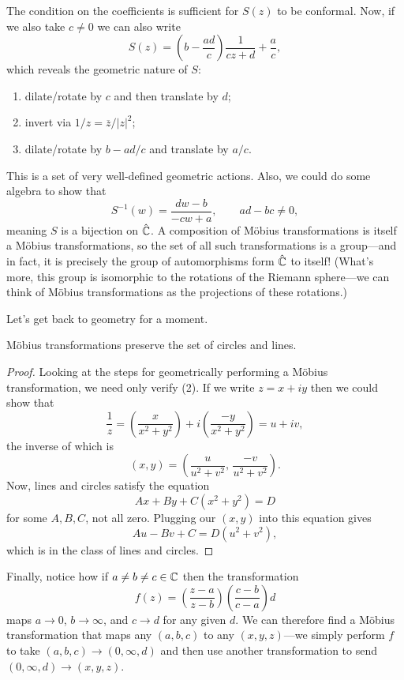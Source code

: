 \documentclass[../m136main.tex]{subfiles}
\begin{document}
The condition on the coefficients is sufficient for $S(z)$ to be conformal.
Now, if we also take $c \neq 0$ we can also write
\[ S(z) = \left( b - \frac{ad}{c} \right) \frac{1}{cz + d} + \frac{a}{c}, \]
which reveals the geometric nature of $S$:
\begin{enumerate}[topsep=0pt]
    \item dilate/rotate by $c$ and then translate by $d$;
    \item invert via $1 / z = \overline z / |z|^2$;
    \item dilate/rotate by $b - ad / c$ and translate by $a / c$.
\end{enumerate}
This is a set of very well-defined geometric actions.
Also, we could do some algebra to show that
\[ S^{-1}(w) = \frac{dw - b}{-cw + a}, \qquad ad - bc \neq 0, \]
meaning $S$ is a bijection on $\hat {\mathbb{C}}$.
A composition of Möbius transformations is itself a Möbius transformations, so the set of all such transformations is a group---and in fact, it is precisely the group of automorphisms form $\hat {\mathbb{C}}$ to itself!
(What's more, this group is isomorphic to the rotations of the Riemann sphere---we can think of Möbius transformations as the projections of these rotations.)

Let's get back to geometry for a moment.

\begin{theorem}[]
    Möbius transformations preserve the set of circles and lines.
\end{theorem}

\begin{proof}
    Looking at the steps for geometrically performing a Möbius transformation, we need only verify (2).
    If we write $z = x + iy$ then we could show that
    \[ \frac{1}{z} = \left( \frac{x}{x^2 + y^2} \right) + i \left( \frac{-y}{x^2 + y^2} \right) = u + iv, \]
    the inverse of which is
    \[ (x,y) = \left( \frac{u}{u^2 + v^2}, \, \frac{-v}{u ^2+ v^2} \right). \]
    Now, lines and circles satisfy the equation
    \[ Ax + By + C(x^2 + y^2) = D \]
    for some $A,B,C$, not all zero.
    Plugging our $(x,y)$ into this equation gives
    \[ Au - Bv + C = D(u^2 + v^2), \]
    which is in the class of lines and circles.
\end{proof}

Finally, notice how if $a \neq b \neq c \in \mathbb{C}$ then the transformation
\[ f(z) = \left( \frac{z-a}{z-b} \right) \left( \frac{c-b}{c-a} \right) d \]
maps $a \to 0$, $b \to \infty$, and $c \to d$ for any given $d$.
We can therefore find a Möbius transformation that maps any $(a,b,c)$ to any $(x,y,z)$---we simply perform $f$ to take $(a,b,c) \to (0, \infty, d)$ and then use another transformation to send $(0, \infty, d) \to (x,y,z)$.
\end{document}
